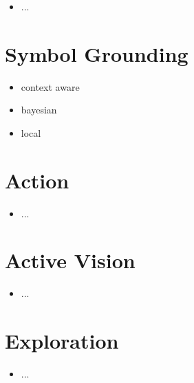 \documentclass{article}
\begin{document}
	\begin{itemize}
		\item ...
	\end{itemize}

	\section{Symbol Grounding}
	
	\begin{itemize}
		\item context aware
		\item bayesian
		\item local
	\end{itemize}
	
	\section{Action}
	
	\begin{itemize}
		\item ...
	\end{itemize}
	
	\section{Active Vision}
	
	\begin{itemize}
		\item ...
	\end{itemize}
	
	\section{Exploration}
	
	\begin{itemize}
		\item ...
	\end{itemize}
		
	\clearpage
	
	
	
	\clearpage
	
	
	
	
\end{document}
